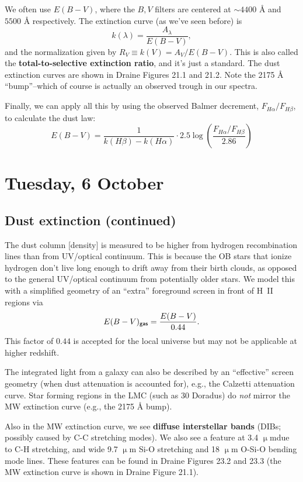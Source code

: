 \documentclass{tufte-handout}
\renewcommand{\textbf}[1]{{\bf \textcolor{dark-gray}{#1}}}
\renewcommand{\rm}{\sf}
\newcommand{\HII}{\textnormal{H{\smaller~\textsc{II}}}}
\newcommand{\m}{\upmu} %
\newcommand{\um}{$\m{}$m}
\begin{document}
We often use $E(B-V)$, where the $B,V$ filters are centered at $\sim 4400$ \AA{} and $5500$ \AA{} respectively. The extinction curve (as we've seen before) is
\begin{equation}
k(\lambda) = \frac{A_\lambda}{E(B-V)},
\end{equation}
and the normalization given by $R_V \equiv k(V) = A_V / E(B-V)$. This is also called the \textbf{total-to-selective extinction ratio}, and it's just a standard. The dust extinction curves are shown in Draine Figures 21.1 and 21.2. Note the 2175 \AA{} ``bump''--which of course is actually an observed trough in our spectra.

Finally, we can apply all this by using the observed Balmer decrement, $F_{H\alpha}/F_{H\beta}$, to calculate the dust law:
\[E(B-V) = \frac{1}{k(H\beta) - k(H\alpha)} \cdot 2.5 \log \left (\frac{F_{H\alpha} / F_{H\beta	}}{2.86}\right )\]

\section{Tuesday, 6 October}

\subsection{Dust extinction (continued)}

The dust column [density] is measured to be higher from hydrogen recombination lines than from UV/optical continuum. This is because the OB stars that ionize hydrogen don't live long enough to drift away from their birth clouds, as opposed to the general UV/optical continuum from potentially older stars. We model this with a simplified geometry of an ``extra'' foreground screen in front of \HII{} regions via
\[E(B-V)_{\rm gas} = \frac{E(B-V)}{0.44}.\]
This factor of $0.44$ is accepted for the local universe but may not be applicable at higher redshift.

The integrated light from a galaxy can also be described by an ``effective'' screen geometry (when dust attenuation is accounted for), e.g., the Calzetti attenuation curve. Star forming regions in the LMC (such as 30 Doradus) do \textit{not} mirror the MW extinction curve (e.g., the 2175 \AA{} bump).

Also in the MW extinction curve, we see \textbf{diffuse interstellar bands} (DIBs; possibly caused by C-C stretching modes). We also see a feature at 3.4 \um due to C-H stretching, and wide 9.7 \um{} Si-O stretching and 18 \um{} O-Si-O bending mode lines. These features can be found in Draine Figures 23.2 and 23.3 (the MW extinction curve is shown in Draine Figure 21.1).
\end{document}
